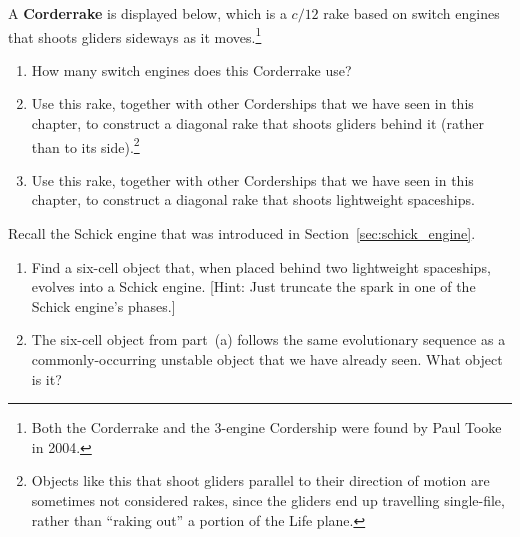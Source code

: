 \begin{multicols}{2}
	
	\mfilbreak
	
	
	\begin{problemstar}\label{exer:corderrake} 
		A \textbf{Corderrake} is displayed below, which is a $c/12$ rake based on switch engines that shoots gliders sideways as it moves.\footnote{Both the Corderrake and the 3-engine Cordership were found by Paul Tooke in 2004.} %
		
		\begin{center}
		\end{center}
		
		\begin{enumerate}[label=\bf\color{ocre}(\alph*)]
			\item How many switch engines does this Corderrake use?
			
			\item Use this rake, together with other Corderships that we have seen in this chapter, to construct a diagonal rake that shoots gliders behind it (rather than to its side).\footnote{Objects like this that shoot gliders parallel to their direction of motion are sometimes not considered rakes, since the gliders end up travelling single-file, rather than ``raking out'' a portion of the Life plane.}
			
			\item Use this rake, together with other Corderships that we have seen in this chapter, to construct a diagonal rake that shoots lightweight spaceships.
		\end{enumerate}
	\end{problemstar}
	
	
	\mfilbreak
	
	
	\begin{problemstar}\label{exer:six_cell_schick} 
		Recall the Schick engine that was introduced in Section~\ref{sec:schick_engine}.\smallskip
		\begin{enumerate}[label=\bf\color{ocre}(\alph*)]
			\item Find a six-cell object that, when placed behind two lightweight spaceships, evolves into a Schick engine. [Hint: Just truncate the spark in one of the Schick engine's phases.]
			
			\item The six-cell object from part~(a) follows the same evolutionary sequence as a commonly-occurring unstable object that we have already seen. What object is it?
		\end{enumerate}
	\end{problemstar}
	

\end{multicols}
